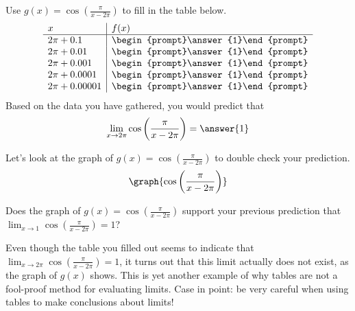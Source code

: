 \documentclass[handout]{ximera}
\begin{document}
\begin{exercise}
Use $g(x) = \cos\left(\frac{\pi}{x-2\pi}\right)$ to fill in the table below.
  \[
  \begin{array}{l|l}
    x      & f(x)      \\ \hline
    2\pi + 0.1    & \begin{prompt}\answer{1}\end{prompt}\\
    2\pi + 0.01    & \begin{prompt}\answer{1}\end{prompt}\\
    2\pi + 0.001   & \begin{prompt}\answer{1}\end{prompt}\\
    2\pi + 0.0001  & \begin{prompt}\answer{1}\end{prompt}\\
    2\pi + 0.00001 & \begin{prompt}\answer{1}\end{prompt}
  \end{array}
  \]
  Based on the data you have gathered, you would predict that 
  \[
  \lim_{x\to 2\pi}  \cos\left(\frac{\pi}{x-2\pi}\right)= \answer{1}
  \]
  
    \begin{exercise}
Let's look at the graph of $g(x) = \cos\left(\frac{\pi}{x-2\pi}\right)$ to double check your prediction. 
\[
\graph{\cos\left(\frac{\pi}{x-2\pi}\right)}
\]

Does the graph of $g(x) = \cos\left(\frac{\pi}{x-2\pi}\right)$ support your previous prediction that $\lim_{x\to 1} \cos\left(\frac{\pi}{x-2\pi}\right) = 1$? 

\begin{multipleChoice}
    
\begin{feedback}[correct]

Even though the table you filled out seems to indicate that $\lim_{x\to 2\pi}  \cos\left(\frac{\pi}{x-2\pi}\right)= 1$, it turns out that this limit actually does not exist, as the graph of $g(x)$ shows.  This is yet another example of why tables are not a fool-proof method for evaluating limits.  Case in point: be very careful when using tables to make conclusions about limits! 

\end{feedback}
\end{multipleChoice}
    \end{exercise}

\end{exercise}
\end{document}
